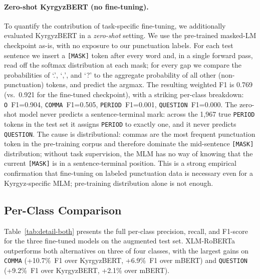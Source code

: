 \documentclass[manuscript, review]{acmart}
\begin{document}
\paragraph{Zero-shot KyrgyzBERT (no fine-tuning).}
To quantify the contribution of task-specific fine-tuning, we additionally evaluated KyrgyzBERT in a \emph{zero-shot} setting. We use the pre-trained masked-LM checkpoint as-is, with no exposure to our punctuation labels. For each test sentence we insert a \texttt{[MASK]} token after every word and, in a single forward pass, read off the softmax distribution at each mask; for every gap we compare the probabilities of `.', `,', and `?' to the aggregate probability of all other (non-punctuation) tokens, and predict the argmax. The resulting weighted F1 is 0.769 (vs.~0.921 for the fine-tuned checkpoint), with a striking per-class breakdown: \texttt{O}~F1=0.904, \texttt{COMMA}~F1=0.505, \texttt{PERIOD}~F1=0.001, \texttt{QUESTION}~F1=0.000. The zero-shot model never predicts a sentence-terminal mark: across the 1{,}967 true \texttt{PERIOD} tokens in the test set it assigns \texttt{PERIOD} to exactly one, and it never predicts \texttt{QUESTION}. The cause is distributional: commas are the most frequent punctuation token in the pre-training corpus and therefore dominate the mid-sentence \texttt{[MASK]} distribution; without task supervision, the MLM has no way of knowing that the current \texttt{[MASK]} is in a sentence-terminal position. This is a strong empirical confirmation that fine-tuning on labeled punctuation data is necessary even for a Kyrgyz-specific MLM; pre-training distribution alone is not enough.

\subsection{Per-Class Comparison}

Table~\ref{tab:detail-both} presents the full per-class precision, recall, and F1-score for the three fine-tuned models on the augmented test set. XLM-RoBERTa outperforms both alternatives on three of four classes, with the largest gains on \texttt{COMMA} (+10.7\%~F1 over KyrgyzBERT, +6.9\%~F1 over mBERT) and \texttt{QUESTION} (+9.2\%~F1 over KyrgyzBERT, +2.1\% over mBERT).
\end{document}
